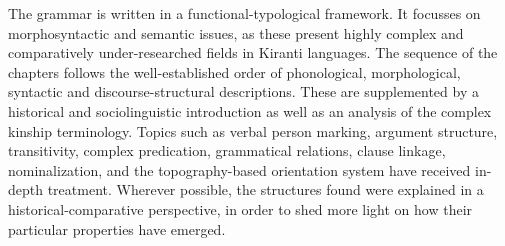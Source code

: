 \documentclass[a4paper, 12pt, bibliography=totoc, headsepline]{scrartcl}
\begin{document}
The grammar is written in a functional-typological framework. It focusses on morphosyntactic and semantic issues, as these present highly complex and comparatively under-researched fields in Kiranti languages. The sequence of the chapters follows the well-established order of phonological, morphological, syntactic and discourse-structural descriptions. These are supplemented by a historical and sociolinguistic introduction as well as an analysis of the complex kinship terminology. Topics such as verbal person marking, argument structure, transitivity, complex predication, grammatical relations, clause linkage, nominalization, and the topography-based orientation system have received in-depth treatment. Wherever possible, the structures found  were explained in a historical-comparative perspective, in order to shed more light on how their particular properties have emerged.
\end{document}
